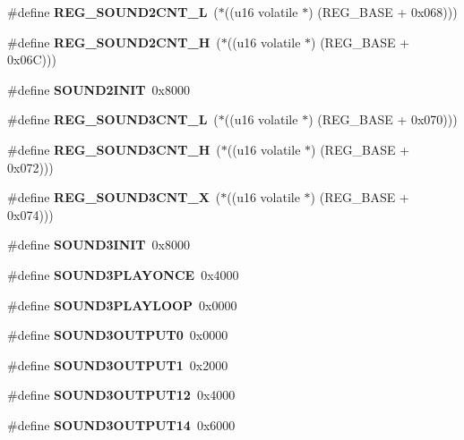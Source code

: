 \begin{DoxyCompactItemize}
\item 
\#define {\bfseries REG\_\-SOUND2CNT\_\-L}~($\ast$((u16 volatile $\ast$) (REG\_\-BASE + 0x068)))\label{register_8h_a27c9b8488e4d8f37c8dde9a4bacfd9dc}

\item 
\#define {\bfseries REG\_\-SOUND2CNT\_\-H}~($\ast$((u16 volatile $\ast$) (REG\_\-BASE + 0x06C)))\label{register_8h_a90d7cca3084e31ee176161bccd68b3d2}

\item 
\#define {\bfseries SOUND2INIT}~0x8000\label{register_8h_a9e02014cad322245e4c3d66b5261de2c}

\item 
\#define {\bfseries REG\_\-SOUND3CNT\_\-L}~($\ast$((u16 volatile $\ast$) (REG\_\-BASE + 0x070)))\label{register_8h_aff159c97cb75854277a29327634a755f}

\item 
\#define {\bfseries REG\_\-SOUND3CNT\_\-H}~($\ast$((u16 volatile $\ast$) (REG\_\-BASE + 0x072)))\label{register_8h_af3a36f8283c5b474339ccf3883323605}

\item 
\#define {\bfseries REG\_\-SOUND3CNT\_\-X}~($\ast$((u16 volatile $\ast$) (REG\_\-BASE + 0x074)))\label{register_8h_aca6f88ea849cab35a35759553a611687}

\item 
\#define {\bfseries SOUND3INIT}~0x8000\label{register_8h_a3c14d32e260d6002d3d8aa95d908464a}

\item 
\#define {\bfseries SOUND3PLAYONCE}~0x4000\label{register_8h_a8037a9a8b21f56f67276aa2c19d14f7e}

\item 
\#define {\bfseries SOUND3PLAYLOOP}~0x0000\label{register_8h_aa060ff1a20c1ca6dbe408d09135c69ff}

\item 
\#define {\bfseries SOUND3OUTPUT0}~0x0000\label{register_8h_ad60eda5a32d562f32873c9c8947c7c64}

\item 
\#define {\bfseries SOUND3OUTPUT1}~0x2000\label{register_8h_a286c7b462f17f2368a48a92b0b3bce8e}

\item 
\#define {\bfseries SOUND3OUTPUT12}~0x4000\label{register_8h_ab7f59c9a47828abe69a85a89e32c5956}

\item 
\#define {\bfseries SOUND3OUTPUT14}~0x6000\label{register_8h_a8ac27ce83d2d0d85c516c798e1d20808}


\end{DoxyCompactItemize}
